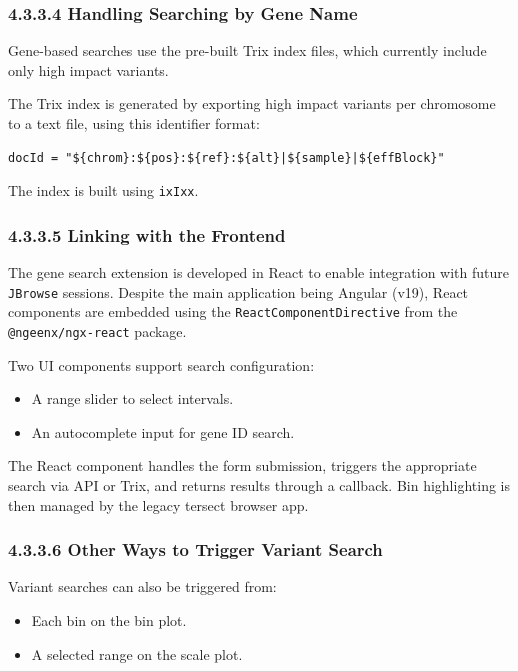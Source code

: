\documentclass[12pt]{article}
\begin{document}
\subsubsection*{4.3.3.4 Handling Searching by Gene Name}

Gene-based searches use the pre-built Trix index files, which currently include only high impact variants.

The Trix index is generated by exporting high impact variants per chromosome to a text file, using this identifier format:

\begin{verbatim}
docId = "${chrom}:${pos}:${ref}:${alt}|${sample}|${effBlock}"
\end{verbatim}

The index is built using \texttt{ixIxx}.

\subsubsection*{4.3.3.5 Linking with the Frontend}

The gene search extension is developed in React to enable integration with future \texttt{JBrowse} sessions. Despite the main application being Angular (v19), React components are embedded using the \texttt{ReactComponentDirective} from the \texttt{@ngeenx/ngx-react} package.

Two UI components support search configuration:
\begin{itemize}
  \item A range slider to select intervals.
  \item An autocomplete input for gene ID search.
\end{itemize}

The React component handles the form submission, triggers the appropriate search via API or Trix, and returns results through a callback. Bin highlighting is then managed by the legacy tersect browser app.

\subsubsection*{4.3.3.6 Other Ways to Trigger Variant Search}

Variant searches can also be triggered from:
\begin{itemize}
  \item Each bin on the bin plot.
  \item A selected range on the scale plot.
\end{itemize}
\end{document}
